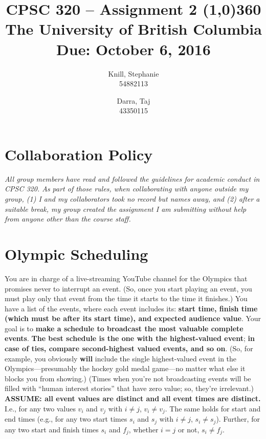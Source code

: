 \documentclass[11pt, oneside]{article}   	%
\theoremstyle{definition}
\theoremstyle{remark}
\begin{document}
\title{CPSC 320 -- Assignment 2
\line(1,0){360} \\               %
\vspace{0.5cm}
\large
The University of British Columbia \\
Due: October 6, 2016
\vspace{1cm}}
\author{
Knill, Stephanie\\
54882113
\and
Darra, Taj \\
43350115
}
\date{}                    %
\maketitle
\thispagestyle{empty}    %

\medskip 
\section*{Collaboration Policy}
\emph{All group members have read and followed the guidelines for academic conduct in CPSC 320. As part of those rules, when collaborating with anyone outside my group, (1) I and my collaborators took no record but names away, and (2) after a suitable break, my group created the assignment I am submitting without help from anyone other than the course staff.}

\cleardoublepage
\section{Olympic Scheduling}
You are in charge of a live-streaming YouTube channel for the Olympics
that promises never to interrupt an event. (So, once you start playing
an event, you must play only that event from the time it starts to the
time it finishes.) You have a list of the events, where each event
includes its: \textbf{start time, finish time (which must be after its start time), and expected audience value}. Your goal is to \textbf{make a schedule to broadcast the most valuable complete events}. \textbf{The best schedule is the one with the highest-valued event}; \textbf{in case of ties, compare second-highest valued events, and so on}. (So, for example, you
obviously \textbf{will} include the single highest-valued event in the
Olympics---presumably the hockey gold medal game---no matter what else
it blocks you from showing.)
(Times when you're not broadcasting events will be filled with ``human
interest stories'' that have zero value; so, they're irrelevant.)
\textbf{ASSUME: all event values are distinct and all event times are distinct.} I.e., for any two values $v_i$ and $v_j$ with $i \neq j$,
$v_i \neq v_j$. The same holds for start and end times (e.g., for any
two start times $s_i$ and $s_j$ with $i \neq j$, $s_i \neq
s_j$). Further, for any two start and finish times $s_i$ and $f_j$,
whether $i = j$ or not, $s_i \neq f_j$.
\end{document}
